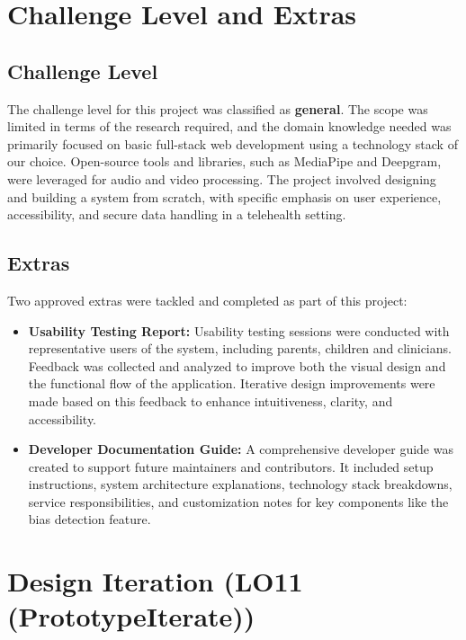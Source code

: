 \documentclass{article}
\begin{document}
\newpage

\section{Challenge Level and Extras}

\subsection{Challenge Level}

The challenge level for this project was classified as \textbf{general}. The scope was limited in terms of the research required, and the domain knowledge needed was primarily focused on basic full-stack web development using a technology stack of our choice. 
Open-source tools and libraries, such as MediaPipe and Deepgram, were leveraged for audio and video processing. The project involved designing and building a system from scratch, with specific emphasis on user experience, accessibility, and secure data handling in a telehealth setting.

\subsection{Extras}

Two approved extras were tackled and completed as part of this project:

\begin{itemize}
    \item \textbf{Usability Testing Report:} Usability testing sessions were conducted with representative users of the system, including parents, children and clinicians. 
    Feedback was collected and analyzed to improve both the visual design and the functional flow of the application. Iterative design improvements were made based on this feedback to enhance intuitiveness, clarity, and accessibility.
    
    \item \textbf{Developer Documentation Guide:} A comprehensive developer guide was created to support future maintainers and contributors. 
    It included setup instructions, system architecture explanations, technology stack breakdowns, service responsibilities, and customization notes for key components like the bias detection feature.
\end{itemize}

\newpage

\section{Design Iteration (LO11 (PrototypeIterate))}
\end{document}
